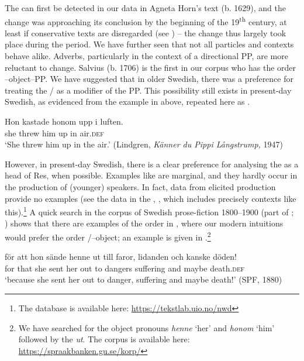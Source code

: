\documentclass[output=paper]{langscibook}
\begin{document}
The  can first be detected in our data in Agneta Horn’s text (b. 1629), and the change was approaching its conclusion by the beginning of the 19\textsuperscript{th} century, at least if conservative texts are disregarded (see ) – the change thus largely took place during the  period. We have further seen that not all particles and contexts behave alike. Adverbs, particularly in the context of a directional PP, are more reluctant to change. Salvius (b. 1706) is the first in our corpus who has the order –object–PP. We have suggested that in older Swedish, there was a preference for treating the / as a modifier of the PP. This possibility still exists in present-day Swedish, as evidenced from the example in  above, repeated here as .


\ea\label{ex:lalu:64}
\gll  Hon    kastade   honom   upp     i   luften.\\
she       threw     him     up     in   air.\textsc{def}\\
\glt `She threw him up in the air.’ (Lindgren, \textit{Känner du Pippi Långstrump,} 1947)\\
\z


However, in present-day Swedish, there is a clear preference for analysing the  as a head of Res, when possible. Examples like  are marginal, and they hardly occur in the production of (younger) speakers. In fact, data from elicited production provide no examples (see the data in the , \citealt{LundquistEtAl2019}, which includes precisely contexts like this).\footnote{The database is available here: \url{https://tekstlab.uio.no/nwd}}  A quick search in the corpus of Swedish prose-fiction 1800–1900 (part of ; \citealt{BorinEtAl2012}) shows that there are examples of the order in , where our modern intuitions would prefer the order /–object; an example is given in .\footnote{We have searched for the object pronouns \textit{henne} ‘her’ and \textit{honom} ‘him’ followed by the  \textit{ut}. The corpus is available here: \url{https://spraakbanken.gu.se/korp/}}


\ea\label{ex:lalu:65}
\gll  för   att   hon   sände   henne   ut     till   faror, lidanden   och  kanske   döden!\\
for   that     she   sent     her   out     to   dangers suffering   and   maybe   death.\textsc{def}\\
\glt `because she sent her out to danger, suffering and maybe death!’ (SPF, 1880)\\
\z
\end{document}
